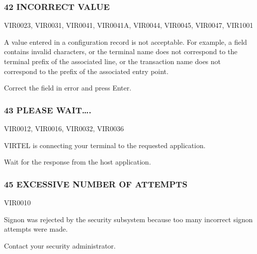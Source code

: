 \documentclass[letterpaper,10pt,english]{sphinxmanual}
\begin{document}
\subsubsection{42 INCORRECT VALUE}
\label{\detokenize{messages:incorrect-value}}\begin{description}
\sphinxAtStartPar
VIR0023, VIR0031, VIR0041, VIR0041A, VIR0044, VIR0045, VIR0047, VIR1001

\sphinxAtStartPar
A value entered in a configuration record is not acceptable. For example, a field contains invalid characters, or the terminal name does not correspond to the terminal prefix of the associated line, or the transaction name does not correspond to the prefix of the associated entry point.

\sphinxAtStartPar
Correct the field in error and press Enter.

\end{description}


\subsubsection{43 PLEASE WAIT….}
\label{\detokenize{messages:please-wait}}\begin{description}
\sphinxAtStartPar
VIR0012, VIR0016, VIR0032, VIR0036

\sphinxAtStartPar
VIRTEL is connecting your terminal to the requested application.

\sphinxAtStartPar
Wait for the response from the host application.

\end{description}


\subsubsection{45 EXCESSIVE NUMBER OF ATTEMPTS}
\label{\detokenize{messages:excessive-number-of-attempts}}\begin{description}
\sphinxAtStartPar
VIR0010

\sphinxAtStartPar
Signon was rejected by the security subsystem because too many incorrect signon attempts were made.

\sphinxAtStartPar
Contact your security administrator.

\end{description}
\end{document}

